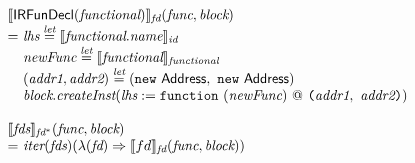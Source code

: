 \[\begin{array}{l@{}l@{~}l}
\lefteqn{\transfun{\IRFunDecl(\emph{functional})}_{\emph{fd}}(\emph{func}, \emph{block})}\\
& = & \emph{lhs} \letval \transfun{\emph{functional}.\emph{name}}_{\emph{id}}\\
& & \emph{newFunc} \letval \transfun{\emph{functional}}_{\emph{functional}}\\
& & (\emph{addr1}, \emph{addr2}) \letval (\new\ \Address,\ \new\ \Address)\\
& & \emph{block}.\emph{createInst}(\emph{lhs} := \TT{function}\ (\emph{newFunc}) ~@~
\TT{(}\emph{addr1},\ \emph{addr2}\TT{)})\\
& & \\

\lefteqn{\transfun{\emph{fds}}_{\emph{fd}^{*}}(\emph{func}, \emph{block})}\\
& = & \iter(\emph{fds})(\lambda(\emph{fd}) \Rightarrow \transfun{fd}_{\emph{fd}}(\emph{func}, \emph{block}))\\
& & \\

\end{array}
\]

